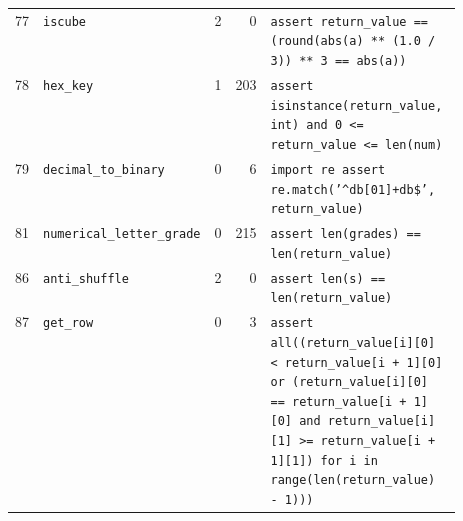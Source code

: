 \begin{footnotesize}
\begin{longtable}{@{}r l r r p{0.52\linewidth}@{}}
77 & \texttt{iscube} & 2 & 0 & \texttt{assert \allowbreak{}return\_value \allowbreak{}=\allowbreak{}=\allowbreak{} \allowbreak{}(\allowbreak{}round(\allowbreak{}abs(\allowbreak{}a)\allowbreak{} \allowbreak{}*\allowbreak{}*\allowbreak{} \allowbreak{}(\allowbreak{}1.\allowbreak{}0 \allowbreak{}/\allowbreak{} \allowbreak{}3)\allowbreak{})\allowbreak{} \allowbreak{}*\allowbreak{}*\allowbreak{} \allowbreak{}3 \allowbreak{}=\allowbreak{}=\allowbreak{} \allowbreak{}abs(\allowbreak{}a)\allowbreak{})\allowbreak{}} \\
78 & \texttt{hex\_key} & 1 & 203 & \texttt{assert \allowbreak{}isinstance(\allowbreak{}return\_value,\allowbreak{} \allowbreak{}int)\allowbreak{} \allowbreak{}and \allowbreak{}0 \allowbreak{}<\allowbreak{}=\allowbreak{} \allowbreak{}return\_value \allowbreak{}<\allowbreak{}=\allowbreak{} \allowbreak{}len(\allowbreak{}num)\allowbreak{}} \\
79 & \texttt{decimal\_to\_binary} & 0 & 6 & \texttt{import \allowbreak{}re
assert \allowbreak{}re.\allowbreak{}match(\allowbreak{}'\allowbreak{}\^{}db[\allowbreak{}01]\allowbreak{}+\allowbreak{}db\$'\allowbreak{},\allowbreak{} \allowbreak{}return\_value)\allowbreak{}} \\
81 & \texttt{numerical\_letter\_grade} & 0 & 215 & \texttt{assert \allowbreak{}len(\allowbreak{}grades)\allowbreak{} \allowbreak{}=\allowbreak{}=\allowbreak{} \allowbreak{}len(\allowbreak{}return\_value)\allowbreak{}} \\
86 & \texttt{anti\_shuffle} & 2 & 0 & \texttt{assert \allowbreak{}len(\allowbreak{}s)\allowbreak{} \allowbreak{}=\allowbreak{}=\allowbreak{} \allowbreak{}len(\allowbreak{}return\_value)\allowbreak{}} \\
87 & \texttt{get\_row} & 0 & 3 & \texttt{assert \allowbreak{}all(\allowbreak{}(\allowbreak{}return\_value[\allowbreak{}i]\allowbreak{}[\allowbreak{}0]\allowbreak{} \allowbreak{}<\allowbreak{} \allowbreak{}return\_value[\allowbreak{}i \allowbreak{}+\allowbreak{} \allowbreak{}1]\allowbreak{}[\allowbreak{}0]\allowbreak{} \allowbreak{}or \allowbreak{}(\allowbreak{}return\_value[\allowbreak{}i]\allowbreak{}[\allowbreak{}0]\allowbreak{} \allowbreak{}=\allowbreak{}=\allowbreak{} \allowbreak{}return\_value[\allowbreak{}i \allowbreak{}+\allowbreak{} \allowbreak{}1]\allowbreak{}[\allowbreak{}0]\allowbreak{} \allowbreak{}and \allowbreak{}return\_value[\allowbreak{}i]\allowbreak{}[\allowbreak{}1]\allowbreak{} \allowbreak{}>\allowbreak{}=\allowbreak{} \allowbreak{}return\_value[\allowbreak{}i \allowbreak{}+\allowbreak{} \allowbreak{}1]\allowbreak{}[\allowbreak{}1]\allowbreak{})\allowbreak{} \allowbreak{}for \allowbreak{}i \allowbreak{}in \allowbreak{}range(\allowbreak{}len(\allowbreak{}return\_value)\allowbreak{} \allowbreak{}-\allowbreak{} \allowbreak{}1)\allowbreak{})\allowbreak{})\allowbreak{}} \\

\end{longtable}
\end{footnotesize}
